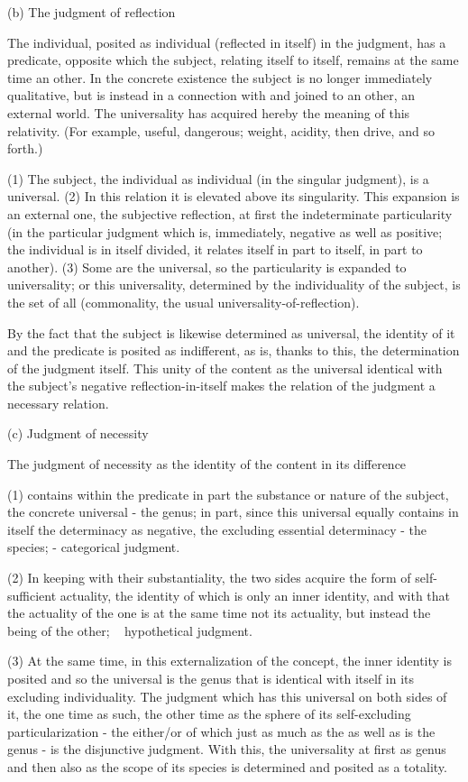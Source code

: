 (b) The judgment of reflection

The individual, posited as individual
(reflected in itself) in the judgment,
has a predicate, opposite which the subject,
relating itself to itself,
remains at the same time an other.
In the concrete existence the subject is
no longer immediately qualitative,
but is instead in a connection with
and joined to an other, an external world.
The universality has acquired hereby
the meaning of this relativity.
(For example, useful, dangerous;
weight, acidity, then drive, and so forth.)

(1) The subject, the individual as individual
(in the singular judgment), is a universal.
(2) In this relation it is elevated above its singularity.
This expansion is an external one, the subjective reflection,
at first the indeterminate particularity
(in the particular judgment
which is, immediately, negative as well as positive;
the individual is in itself divided,
it relates itself in part to itself,
in part to another).
(3) Some are the universal,
so the particularity is expanded to universality;
or this universality, determined by the individuality of the subject,
is the set of all (commonality, the usual universality-of-reflection).

By the fact that the subject is likewise determined as universal,
the identity of it and the predicate is posited as indifferent,
as is, thanks to this, the determination of the judgment itself.
This unity of the content as the universal identical with
the subject's negative reflection-in-itself makes
the relation of the judgment a necessary relation.

(c) Judgment of necessity

The judgment of necessity as the identity of the content in its difference

(1) contains within the predicate in part the substance or nature of the
subject, the concrete universal - the genus; in part, since this universal
equally contains in itself the determinacy as negative, the excluding essential
determinacy - the species; - categorical judgment.

(2) In keeping with their substantiality, the two sides acquire the form
of self-sufficient actuality, the identity of which is only an inner identity,
and with that the actuality of the one is at the same time not its actuality,
but instead the being of the other; ~ hypothetical judgment.

(3) At the same time, in this externalization of the concept, the inner
identity is posited and so the universal is the genus that is identical with
itself in its excluding individuality. The judgment which has this universal
on both sides of it, the one time as such, the other time as the sphere of
its self-excluding particularization - the either/or of which just as much
as the as well as is the genus - is the disjunctive judgment. With this, the
universality at first as genus and then also as the scope of its species is
determined and posited as a totality.

